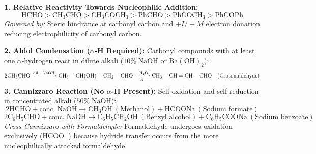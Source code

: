 \documentclass[10pt,a4paper]{article}
\begin{document}
\begin{formulabox}
\textbf{1. Relative Reactivity Towards Nucleophilic Addition:}
\begin{equation}
  \mathrm{HCHO} > \mathrm{CH_3CHO} > \mathrm{CH_3COCH_3} > \mathrm{PhCHO} > \mathrm{PhCOCH_3} > \mathrm{PhCOPh}
\end{equation}
\textit{Governed by:} Steric hindrance at carbonyl carbon and $+I / +M$ electron donation reducing electrophilicity of carbonyl carbon.

\textbf{2. Aldol Condensation ($\alpha$-H Required):}
Carbonyl compounds with at least one $\alpha$-hydrogen react in dilute alkali ($10\%\; \mathrm{NaOH}$ or $\mathrm{Ba(OH)}_2$):
\begin{equation}
  2\mathrm{CH_3CHO} \xrightarrow{\text{dil.\; NaOH}} \mathrm{CH_3-CH(OH)-CH_2-CHO} \xrightarrow[\Delta]{-\mathrm{H_2O}} \mathrm{CH_3-CH=CH-CHO} \quad (\text{Crotonaldehyde})
\end{equation}
\textbf{3. Cannizzaro Reaction (No $\alpha$-H Present):}
Self-oxidation and self-reduction in concentrated alkali ($50\%\; \mathrm{NaOH}$):
\begin{equation}
  2\mathrm{HCHO} + \mathrm{conc.\; NaOH} \longrightarrow \mathrm{CH_3OH} \ (\text{Methanol}) + \mathrm{HCOONa} \ (\text{Sodium formate})
\end{equation}
\begin{equation}
  2\mathrm{C_6H_5CHO} + \mathrm{conc.\; NaOH} \longrightarrow \mathrm{C_6H_5CH_2OH} \ (\text{Benzyl alcohol}) + \mathrm{C_6H_5COONa} \ (\text{Sodium benzoate})
\end{equation}
\textit{Cross Cannizzaro with Formaldehyde:} Formaldehyde undergoes oxidation exclusively ($\mathrm{HCOO}^-$) because hydride transfer occurs from the more nucleophilically attacked formaldehyde.
\end{formulabox}
\end{document}
